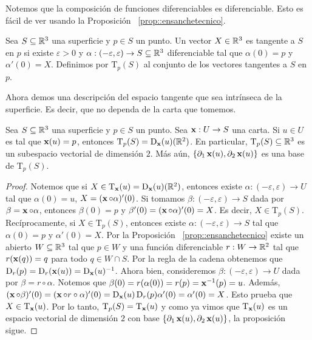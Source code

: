 \begin{obs}
Notemos que la composición de funciones diferenciables es diferenciable. Esto es fácil de ver usando la Proposición ~\ref{prop::ensanchetecnico}.
\end{obs}

\begin{defn}
Sea $S\subseteq\mathbb{R}^3$ una superficie y $p\in S$ un punto. Un vector $X\in\mathbb{R}^3$ es tangente a $S$ en $p$ si existe $\varepsilon>0$ y $\alpha:(-\varepsilon,\varepsilon)\to S\subseteq\mathbb{R}^3$ diferenciable tal que $\alpha(0)=p$ y $\alpha'(0)=X$. Definimos por $\mathrm{T}_p(S)$ al conjunto de los vectores tangentes a $S$ en $p$.
\end{defn}

Ahora demos una descripción del espacio tangente que sea intrínseca de la superficie. Es decir, que no dependa de la carta que tomemos.

\begin{prop}
Sea $S\subseteq\mathbb{R}^3$ una superficie y $p\in S$ un punto. Sea $\operatorname{\mathbf{x}}:U\to S$ una carta. Si $u\in U$ es tal que $\operatorname{\mathbf{x}}(u)=p$, entonces $\mathrm{T}_p(S) = \operatorname{\mathrm{D}}_{\operatorname{\mathbf{x}}}(u)(\mathbb{R}^2)$. En particular, $\mathrm{T}_p(S)\subseteq\mathbb{R}^3$ es un subespacio vectorial de dimensión $2$. Más aún, $\{\partial_1\operatorname{\mathbf{x}}(u),\partial_2\operatorname{\mathbf{x}}(u)\}$ es una base de $\mathrm{T}_p(S)$.
\begin{proof}
Notemos que si $X\in\mathrm{T}_{\operatorname{\mathbf{x}}}(u)=\operatorname{\mathrm{D}}_{\operatorname{\mathbf{x}}}(u)(\mathbb{R}^2)$, entonces existe $\alpha:(-\varepsilon,\varepsilon)\to U$ tal que $\alpha(0)=u$, $X=(\operatorname{\mathbf{x}}\circ\alpha)'(0)$. Si tomamos $\beta:(-\varepsilon,\varepsilon)\to S$ dada por $\beta = \operatorname{\mathbf{x}}\circ\alpha$, entonces $\beta(0)=p$ y $\beta'(0)=(\operatorname{\mathbf{x}}\circ\alpha)'(0)=X$. Es decir, $X\in\mathrm{T}_p(S)$. Recíprocamente, si $X\in\mathrm{T}_p(S)$, entonces existe $\alpha:(-\varepsilon,\varepsilon)\to S$ tal que $\alpha(0)=p$ y $\alpha'(0)=X$. Por la Proposición ~\ref{prop::ensanchetecnico} existe un abierto $W\subseteq\mathbb{R}^3$ tal que $p\in W$ y una función diferenciable $r:W\to \mathbb{R}^2$ tal que $r(\operatorname{\mathbf{x}}(q))=q$ para todo $q\in W\cap S$. Por la regla de la cadena obtenemos que $\operatorname{\mathrm{D}}_{r}(p)=\operatorname{\mathrm{D}}_{r}(\operatorname{\mathbf{x}}(u))=\operatorname{\mathrm{D}}_{\operatorname{\mathbf{x}}}(u)^{-1}$. Ahora bien, consideremos $\beta:(-\varepsilon,\varepsilon)\to U$ dada por $\beta=r\circ\alpha$. Notemos que $\beta(0)=r(\alpha(0))=r(p)=\operatorname{\mathbf{x}}^{-1}(p)=u$. Además, $(\operatorname{\mathbf{x}}\circ\beta)'(0)=(\operatorname{\mathbf{x}}\circ r\circ\alpha)'(0)=\operatorname{\mathrm{D}}_{\operatorname{\mathbf{x}}}(u)\operatorname{\mathrm{D}}_{r}(p)\alpha'(0)=\alpha'(0)=X$. Esto prueba que $X\in\mathrm{T}_{\operatorname{\mathbf{x}}}(u)$. Por lo tanto, $\mathrm{T}_p(S)=\mathrm{T}_{\operatorname{\mathbf{x}}}(u)$ y como ya vimos que $\mathrm{T}_{\operatorname{\mathbf{x}}}(u)$ es un espacio vectorial de dimensión $2$ con base $\{\partial_1\operatorname{\mathbf{x}}(u),\partial_2\operatorname{\mathbf{x}}(u)\}$, la proposición sigue.
\end{proof}
\end{prop}

